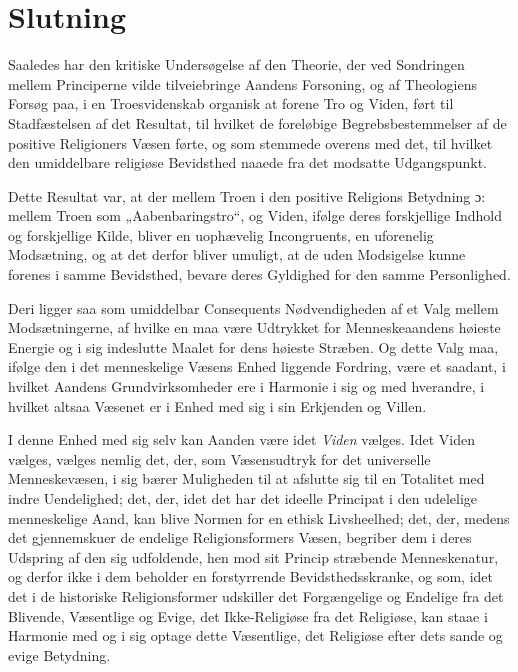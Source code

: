\documentclass[12pt,a4paper]{book}
\newcommand{\opage}[1]{\marginnote{\footnotesize\textit{[#1]}}}
\begin{document}
\chapter*{Slutning}
\label{ch:slutning}

\opage{225}Saaledes har den kritiske Undersøgelse af den Theorie, der ved Sondringen mellem Principerne
vilde tilveiebringe Aandens Forsoning, og af Theologiens Forsøg paa, i en Troesvidenskab
organisk at forene Tro og Viden, ført til Stadfæstelsen af det Resultat, til hvilket de
foreløbige Begrebsbestemmelser af de positive Religioners Væsen førte, og som stemmede overens
med det, til hvilket den umiddelbare religiøse Bevidsthed naaede fra det modsatte Udgangspunkt.

Dette Resultat var, at der mellem Troen i den positive Religions Betydning ɔ: mellem Troen som
„Aabenbaringstro“, og Viden, ifølge deres forskjellige Indhold og forskjellige Kilde, bliver en
uophævelig Incongruents, en uforenelig Modsætning, og at det derfor bliver umuligt, at de uden
Modsigelse kunne forenes i samme Bevidsthed, bevare deres Gyldighed for den samme Personlighed.

Deri ligger saa som umiddelbar Consequents Nødvendigheden af et Valg mellem Modsætningerne, af
hvilke en maa være Udtrykket for Menneskeaandens høieste Energie og i sig indeslutte Maalet for
dens høieste Stræben. Og dette Valg maa, ifølge den i det menneskelige Væsens Enhed liggende
Fordring, være et saadant, i hvilket Aandens Grundvirksomheder ere i Harmonie i sig og med
hverandre, i hvilket altsaa Væsenet er i Enhed med sig i sin Erkjenden og Villen.

I denne Enhed med sig selv kan Aanden være idet \emph{Viden} vælges. Idet Viden vælges, vælges nemlig
det, der, som Væsensudtryk for det universelle Menneskevæsen, i sig bærer Muligheden til at
afslutte sig til en Totalitet med indre Uendelighed; det, der, idet det har det ideelle
Principat i den udelelige menneskelige Aand, kan blive Normen for en ethisk Livsheelhed; det,
der, medens det \opage{226}gjennemskuer de endelige Religionsformers Væsen, begriber dem i deres Udspring
af den sig udfoldende, hen mod sit Princip stræbende Menneskenatur, og derfor ikke i dem
beholder en forstyrrende Bevidsthedsskranke, og som, idet det i de historiske Religionsformer
udskiller det Forgængelige og Endelige fra det Blivende, Væsentlige og Evige, det Ikke-Religiøse
fra det Religiøse, kan staae i Harmonie med og i sig optage dette Væsentlige, det Religiøse efter
dets sande og evige Betydning.
\end{document}
